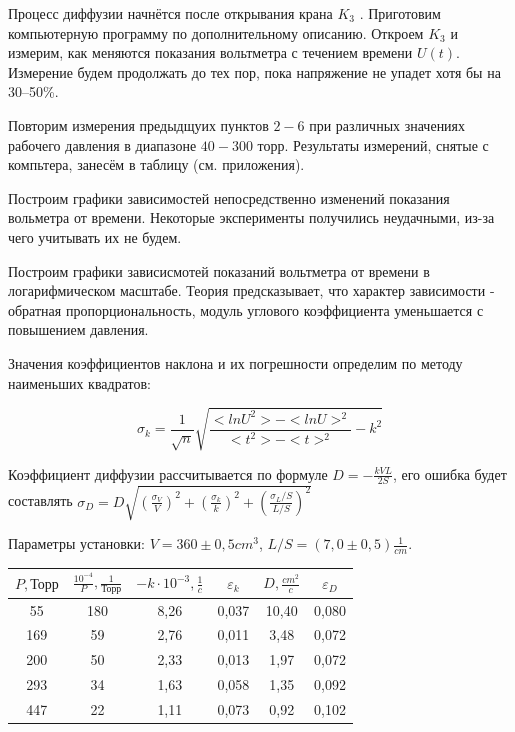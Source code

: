 \documentclass[a4paper, 12pt]{article} %
\begin{document}
Процесс диффузии начнётся после открывания крана $K_3$ . Приготовим компьютерную программу по дополнительному описанию. Откроем $K_3$ и измерим, как меняются показания вольтметра с течением времени $U(t)$. Измерение будем продолжать до тех пор, пока напряжение не упадет хотя бы на 30–50\%.

Повторим измерения предыдщуих пунктов $2 - 6$ при различных значениях рабочего давления в диапазоне $40 - 300$ торр. Результаты измерений, снятые с компьтера, занесём в таблицу (см. приложения).

Построим графики зависимостей непосредственно изменений показания вольметра от времени. Некоторые эксперименты получились неудачными, из-за чего учитывать их не будем. 

Построим графики зависисмотей показаний вольтметра от времени в логарифмическом масштабе. Теория предсказывает, что характер зависимости - обратная пропорциональность, модуль углового коэффициента уменьшается с повышением давления. 

Значения коэффициентов наклона и их погрешности определим по методу наименьших квадратов:

\begin{equation}
    \sigma_k = \frac{1}{\sqrt{n}}\sqrt{\frac{<ln U^2>-<ln U>^2}{<t^2>-<t>^2}-k^2}
\end{equation}

Коэффициент диффузии рассчитывается по формуле $D = -\frac{kVL}{2S}$, его ошибка будет составлять $\sigma_D = D\sqrt{(\frac{\sigma_V}{V})^2+(\frac{\sigma_k}{k})^2+(\frac{\sigma_L/S}{L/S})^2}$

Параметры установки: $V = 360 \pm 0,5 cm^3$, $L/S = (7,0 \pm 0,5) \frac{1}{cm}$.

\begin{center}
    \begin{tabular}{|c|c|c|c|c|c|}
        \hline 
        $P, \text{Торр}$ & $\frac{10^{-4}}{P}, \frac{1}{\text{Торр}}$ & $-k \cdot 10^{-3}, \frac{1}{c}$ & $\varepsilon_{k}$ & $D, \frac{cm^2}{c}$ & $\varepsilon_{D}$ \\ 
        \hline 
        55 & 180 & 8,26 & 0,037 & 10,40 & 0,080 \\ 
        \hline 
        169 & 59 & 2,76 & 0,011 & 3,48 & 0,072 \\ 
        \hline 
        200 & 50 & 2,33 & 0,013 & 1,97 & 0,072 \\ 
        \hline 
        293 & 34 & 1,63 & 0,058 & 1,35 & 0,092 \\ 
        \hline 
        447 & 22 & 1,11 & 0,073 & 0,92 & 0,102 \\ 
        \hline 
    \end{tabular} 
\end{center}
\end{document}
